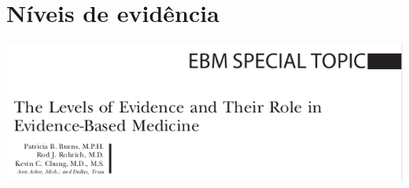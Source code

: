 \documentclass{beamer}
\begin{document}
\section{Níveis de evidência}

\begin{frame}
  \begin{center}
    \includegraphics[width=1.1\textwidth]{Metodos/ebm-tit}
  \end{center}
\end{frame}

\begin{frame}
  \begin{center}

  \end{center}
\end{frame}
\end{document}
